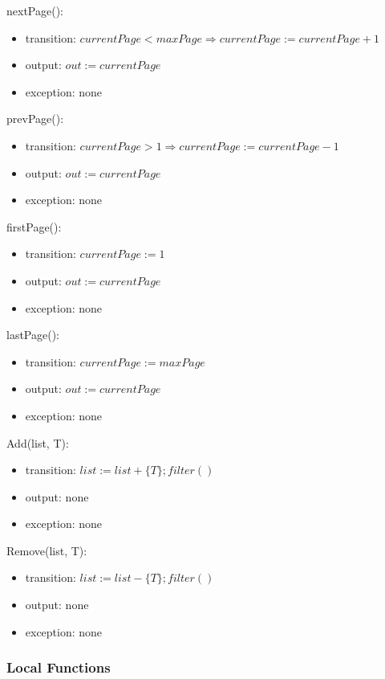 \documentclass[12pt, titlepage]{article}
\begin{document}
\noindent nextPage():
\begin{itemize}
\item transition: $currentPage < maxPage \Rightarrow currentPage := currentPage + 1 $
\item output: $out := currentPage$
\item exception: none
\end{itemize}

\noindent prevPage():
\begin{itemize}
\item transition: $currentPage > 1 \Rightarrow currentPage := currentPage - 1 $
\item output: $out := currentPage$
\item exception: none
\end{itemize}

\noindent firstPage():
\begin{itemize}
\item transition: $currentPage := 1$
\item output: $out := currentPage$
\item exception: none
\end{itemize}

\noindent lastPage():
\begin{itemize}
\item transition: $currentPage := maxPage$
\item output: $out := currentPage$
\item exception: none
\end{itemize}

\noindent Add(list, T):
\begin{itemize}
\item transition: $list := list + \{T\}; filter()$
\item output: none
\item exception: none
\end{itemize}

\noindent Remove(list, T):
\begin{itemize}
\item transition: $list := list - \{T\}; filter()$
\item output: none
\item exception: none
\end{itemize}
\subsubsection{Local Functions}
\end{document}
